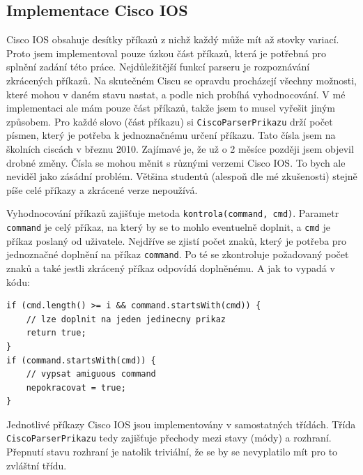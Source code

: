 \subsection{Implementace Cisco IOS}
Cisco IOS obsahuje desítky příkazů z nichž každý může mít až stovky variací. Proto jsem implementoval pouze úzkou část příkazů, která je potřebná pro splnění zadání této práce. Nejdůležitější funkcí parseru je rozpoznávání zkrácených příkazů. Na skutečném Ciscu se opravdu procházejí všechny možnosti, které mohou v daném stavu nastat, a podle nich probíhá vyhodnocování. V mé implementaci ale mám pouze část příkazů, takže jsem to musel vyřešit jiným způsobem. Pro každé slovo (část příkazu) si \verb|CiscoParserPrikazu| drží počet písmen, který je potřeba k jednoznačnému určení příkazu. Tato čísla jsem  na školních ciscách v březnu 2010. Zajímavé je, že už o 2 měsíce později jsem objevil drobné změny. Čísla se mohou měnit s různými verzemi Cisco IOS. To bych ale neviděl jako zásádní problém. Většina studentů (alespoň dle mé zkušenosti) stejně píše celé příkazy a zkrácené verze nepoužívá.

Vyhodnocování příkazů zajišťuje metoda \verb|kontrola(command, cmd)|. Parametr \verb|command| je celý příkaz, na který by se to mohlo eventuelně doplnit, a \verb|cmd| je příkaz poslaný od uživatele. Nejdříve se zjistí počet znaků, který je potřeba pro jednoznačné doplnění na příkaz \verb|command|. Po té se zkontroluje požadovaný počet znaků a také jestli zkrácený příkaz odpovídá doplněnému. A jak to vypadá v kódu:

\begin{verbatim}
if (cmd.length() >= i && command.startsWith(cmd)) {
    // lze doplnit na jeden jedinecny prikaz
    return true;
}
if (command.startsWith(cmd)) {
    // vypsat amiguous command
    nepokracovat = true;
}
\end{verbatim}

Jednotlivé příkazy Cisco IOS jsou implementovány v samostatných třídách. Třída \\\verb|CiscoParserPrikazu| tedy zajišťuje přechody mezi stavy (módy) a  rozhraní. Přepnutí stavu rozhraní je natolik triviální, že se by se nevyplatilo mít pro to zvláštní třídu. 

